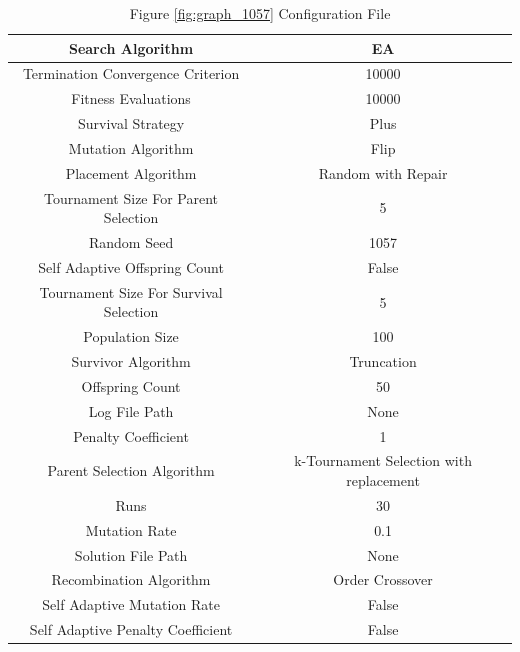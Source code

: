 \documentclass{standalone}
\begin{document}
\begin{table}[!htb]
	\centering
	\caption{Figure \ref{fig:graph_1057} Configuration File}
	\label{tab:graph_1057}
	\begin{tabular}{| c | c |}
		\hline
		Search Algorithm		& EA		 \\
		\hline
		Termination Convergence Criterion		& 10000		 \\
		\hline
		Fitness Evaluations		& 10000		 \\
		\hline
		Survival Strategy		& Plus		 \\
		\hline
		Mutation Algorithm		& Flip		 \\
		\hline
		Placement Algorithm		& Random with Repair		 \\
		\hline
		Tournament Size For Parent Selection		& 5		 \\
		\hline
		Random Seed		& 1057		 \\
		\hline
		Self Adaptive Offspring Count		& False		 \\
		\hline
		Tournament Size For Survival Selection		& 5		 \\
		\hline
		Population Size		& 100		 \\
		\hline
		Survivor Algorithm		& Truncation		 \\
		\hline
		Offspring Count		& 50		 \\
		\hline
		Log File Path		& None		 \\
		\hline
		Penalty Coefficient		& 1		 \\
		\hline
		Parent Selection Algorithm		& k-Tournament Selection with replacement		 \\
		\hline
		Runs		& 30		 \\
		\hline
		Mutation Rate		& 0.1		 \\
		\hline
		Solution File Path		& None		 \\
		\hline
		Recombination Algorithm		& Order Crossover		 \\
		\hline
		Self Adaptive Mutation Rate		& False		 \\
		\hline
		Self Adaptive Penalty Coefficient		& False		 \\
		\hline
	\end{tabular}
\end{table}
\end{document}
